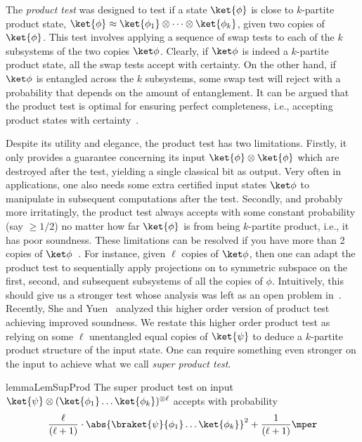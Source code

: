 The \emph{product test} was designed to test if a state $\ket{\phi}$ is close to $k$-partite
product state, \ie $\ket{\phi} \approx \ket{\phi_1} \otimes \cdots \otimes \ket{\phi_k}$, given
two copies of $\ket{\phi}$.
%
This test involves applying a sequence of swap tests to each of the $k$ subsystems of the two
copies $\ket\phi$.
%
Clearly, if $\ket\phi$ is indeed a $k$-partite product state, all the swap tests accept with certainty.
%
On the other hand, if $\ket\phi$ is entangled across the $k$ subsystems, some swap test will reject
with a probability that depends on the amount of entanglement.
%
It can be argued that the product test is optimal for ensuring perfect completeness, i.e., accepting
product states with certainty~\cite{HM13}. 

Despite its utility and elegance, the product test has two limitations.
%
Firstly, it only provides a guarantee concerning its input $\ket{\phi}\otimes \ket{\phi}$ which 
are destroyed after the test, yielding a single classical bit as output.
%
Very often in applications, one also needs some extra certified input states $\ket\phi$ to manipulate in subsequent computations after
the test.
%
Secondly, and  probably more irritatingly, the product test always accepts with some 
constant probability (say $\ge 1/2$) no matter how far $\ket{\phi}$ is from
being $k$-partite product, i.e., it has poor soundness.
%
These limitations can be resolved if you have more than 2 copies of $\ket\phi$~\cite{Kada_2008, SY23}.
%
For instance, given $\ell$ copies of $\ket\phi$, then one can adapt the product test to
sequentially apply projections on to symmetric subspace on the first, second, and subsequent
subsystems of all the copies of $\phi$.
%
Intuitively, this should give us a stronger test whose analysis was left as an open problem in~\cite{HM13}.
%
Recently, She and Yuen~\cite{SY23} analyzed this higher order version of product test achieving improved soundness.
%
We restate this higher order product test as relying on some $\ell$ unentangled equal copies of 
$\ket{\psi}$ to deduce a $k$-partite product structure of the input state.
%
One can require something even stronger on the input to achieve what we call \emph{super product test}.

\begin{restatable}{lemma}{LemSupProd}\label{lem:super_product}
  The super product test on input $\ket{\psi} \otimes (\ket{\phi_1}\ldots\ket{\phi_k})^{\otimes \ell}$ accepts with probability
  \[
  \frac{\ell}{(\ell+1)} \cdot \abs{\braket{\psi}{\phi_1}\ldots\ket{\phi_k}}^2 + \frac{1}{(\ell+1)}\mper
  \]
\end{restatable}

